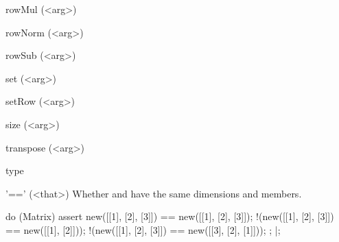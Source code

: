 \begin{urbiscriptapi}
\begin{urbiassert}
\end{urbiassert}

\item[rowMul](<arg>)%
\begin{urbiassert}

\end{urbiassert}

\item[rowNorm](<arg>)%
\begin{urbiassert}

\end{urbiassert}

\item[rowSub](<arg>)%
\begin{urbiassert}

\end{urbiassert}

\item[set](<arg>)%
\begin{urbiassert}

\end{urbiassert}

\item[setRow](<arg>)%
\begin{urbiassert}

\end{urbiassert}

\item[size](<arg>)%
\begin{urbiassert}

\end{urbiassert}

\item[transpose](<arg>)%
\begin{urbiassert}

\end{urbiassert}

\item[type]%
\begin{urbiassert}

\end{urbiassert}

\item['=='](<that>)%
  Whether \this and \that have the same dimensions and members.
\begin{urbiscript}
do (Matrix)
{
  assert
  {
      new([[1], [2], [3]]) == new([[1], [2], [3]]);
    !(new([[1], [2], [3]]) == new([[1], [2]]));
    !(new([[1], [2], [3]]) == new([[3], [2], [1]]));
  };
}|;
\end{urbiscript}


\end{urbiscriptapi}
